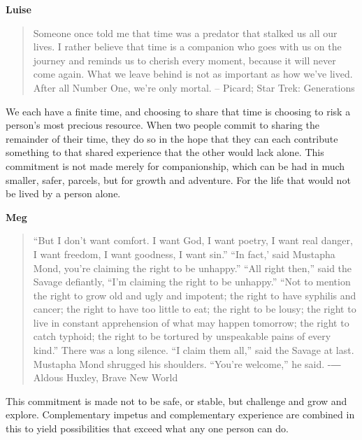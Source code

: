 \documentclass[twoside]{article}
\begin{document}
        \begin{center}
          \textbf{Luise}
        \end{center}
        \begin{quote}
          Someone once told me that time was a predator that stalked us all our lives. I rather believe that time is a companion who goes with us on the journey and reminds us to cherish every moment, because it will never come again. What we leave behind is not as important as how we've lived. After all Number One, we're only mortal. 
          -- Picard; Star Trek: Generations
        \end{quote}
        
We each have a finite time, and choosing to share that time is choosing to risk a person’s most precious resource. When two people commit to sharing the remainder of their time, they do so in the hope that they can each contribute something to that shared experience that the other would lack alone. This commitment is not made merely for companionship, which can be had in much smaller, safer, parcels, but for growth and adventure. For the life that would not be lived by a person alone. 

        \begin{center}
          \textbf{Meg}
        \end{center}
        \begin{quote}
          ``But I don't want comfort. I want God, I want poetry, I want real danger, I want freedom, I want goodness, I want sin.''
          ``In fact,' said Mustapha Mond, you're claiming the right to be unhappy.''
          ``All right then,'' said the Savage defiantly, ``I'm claiming the right to be unhappy.'' 
          ``Not to mention the right to grow old and ugly and impotent; the right to have syphilis and cancer; the right to have too little to eat; the right to be lousy; the right to live in constant apprehension of what may happen tomorrow; the right to catch typhoid; the right to be tortured by unspeakable pains of every kind.'' 
          There was a long silence. ``I claim them all,'' said the Savage at last.
          Mustapha Mond shrugged his shoulders. ``You're welcome,'' he said.
          -― Aldous Huxley, Brave New World
        \end{quote}
        
This commitment is made not to be safe, or stable, but challenge and grow and explore. Complementary impetus and complementary experience are combined in this to yield possibilities that exceed what any one person can do. 
 
\end{document}
